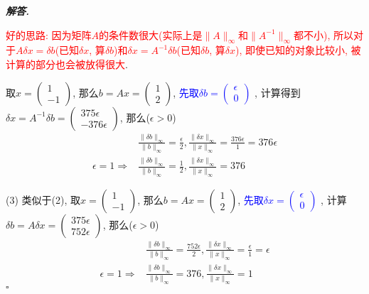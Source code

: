 \documentclass[10pt, a4paper, oneside]{ctexart}
\newcommand{\norm}[1]{\| #1 \|}
\newenvironment{solution}{%
  \par\noindent\textbf{\textit{解答. }}\ignorespaces
}{%
  \hfill\ensuremath{\square}\par %
}
\begin{document}
\begin{solution}
\textcolor{red}{好的思路: 因为矩阵$A$的条件数很大(实际上是$\norm{A}_{\infty}$和$\norm{A^{-1}}_{\infty}$都不小), 所以对于$A\delta x=\delta b$(已知$\delta x$, 算$\delta b$)和$\delta x=A^{-1}\delta b$(已知$\delta b$, 算$\delta x$), 即使已知的对象比较小, 被计算的部分也会被放得很大}.

取$x=\begin{pmatrix}
    1\\-1
\end{pmatrix}$, 那么$b=Ax=\begin{pmatrix}
    1\\2
\end{pmatrix}$, \textcolor{blue}{先取$\delta b = \begin{pmatrix}
\epsilon\\0
\end{pmatrix} $ }, 计算得到$\delta x =A^{-1}\delta b=\begin{pmatrix}
    375\epsilon\\-376\epsilon
\end{pmatrix} $, 那么($\epsilon>0$) 
\begin{align*}
    &\frac{\norm{\delta b}_{\infty}}{\norm{ b}_{\infty}}=\frac{\epsilon}{2}, \frac{\norm{\delta x}_{\infty}}{\norm{ x}_{\infty}}=\frac{376\epsilon}{1}=376\epsilon\\
    \epsilon=1\Rightarrow& \frac{\norm{\delta b}_{\infty}}{\norm{ b}_{\infty}}=\frac{1}{2}, \frac{\norm{\delta x}_{\infty}}{\norm{ x}_{\infty}}=376
\end{align*}

(3) 类似于(2), 取$x=\begin{pmatrix}
    1\\-1
\end{pmatrix}$, 那么$b=Ax=\begin{pmatrix}
    1\\2
\end{pmatrix}$, \textcolor{blue}{先取$\delta x = \begin{pmatrix}
    \epsilon\\0
    \end{pmatrix} $ }, 计算$\delta b = A\delta x=\begin{pmatrix}
        375\epsilon\\ 752\epsilon
    \end{pmatrix} $, 那么($\epsilon>0$) 
\begin{align*}
    &\frac{\norm{\delta b}_{\infty}}{\norm{ b}_{\infty}}=\frac{752\epsilon}{2}, \frac{\norm{\delta x}_{\infty}}{\norm{ x}_{\infty}}=\frac{\epsilon}{1}=\epsilon\\
    \epsilon=1\Rightarrow& \frac{\norm{\delta b}_{\infty}}{\norm{ b}_{\infty}}=376, \frac{\norm{\delta x}_{\infty}}{\norm{ x}_{\infty}}=1
\end{align*}
\end{solution}
\end{document}
